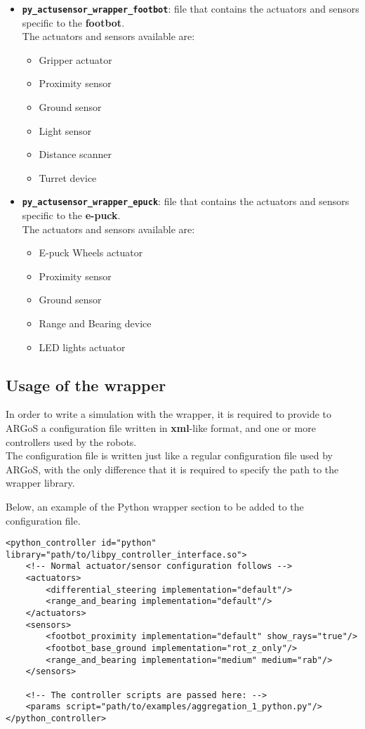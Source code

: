 \documentclass[
12pt,
a4paper,
oneside,
headinclude,
footinclude]{article}
\theoremstyle{definition} %
\begin{document}
\begin{itemize}
    \item \textbf{\texttt{py\_actusensor\_wrapper\_footbot}}: file that contains the actuators and sensors specific to the \textbf{footbot}. \\
    The actuators and sensors available are:
    \begin{itemize}
        \item Gripper actuator
        \item Proximity sensor
        \item Ground sensor
        \item Light sensor
        \item Distance scanner 
        \item Turret device
    \end{itemize}
    
    \item \textbf{\texttt{py\_actusensor\_wrapper\_epuck}}: file that contains the actuators and sensors specific to the \textbf{e-puck}. \\
    The actuators and sensors available are:
    \begin{itemize}
        \item E-puck Wheels actuator
        \item Proximity sensor
        \item Ground sensor
        \item Range and Bearing device
        \item LED lights actuator
    \end{itemize}
\end{itemize}

\subsection{Usage of the wrapper}
In order to write a simulation with the wrapper, it is required to provide to ARGoS a configuration file written in \textbf{xml}-like format, and one or more controllers used by the robots. \\
The configuration file is written just like a regular configuration file used by ARGoS, with the only difference that it is required to specify the path to the wrapper library.

Below, an example of the Python wrapper section to be added to the configuration file.

\lstset{language=XML}
\begin{lstlisting}
<python_controller id="python" library="path/to/libpy_controller_interface.so">
    <!-- Normal actuator/sensor configuration follows -->
    <actuators>
        <differential_steering implementation="default"/>
        <range_and_bearing implementation="default"/>
    </actuators>
    <sensors>
        <footbot_proximity implementation="default" show_rays="true"/>
        <footbot_base_ground implementation="rot_z_only"/>
        <range_and_bearing implementation="medium" medium="rab"/>
    </sensors>
    
    <!-- The controller scripts are passed here: -->
    <params script="path/to/examples/aggregation_1_python.py"/>
</python_controller>
\end{lstlisting}
\end{document}
